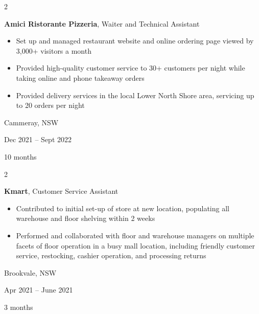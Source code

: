 \documentclass[10pt, a4paper]{article}
\newenvironment{highlights}{
    \begin{itemize}[
        topsep=0.10 cm,
        parsep=0.10 cm,
        partopsep=0pt,
        itemsep=0pt,
        leftmargin=0.4 cm + 10pt
    ]
}{
    \end{itemize}
} %
\newenvironment{twocolentry}[2][]{
    \onecolentry
    \def\secondColumn{#2}
    \setcolumnwidth{\fill, 4.5 cm}
    \begin{paracol}{2}
}{
    \switchcolumn \raggedleft \secondColumn
    \end{paracol}
    \endonecolentry
} %
\begin{document}
        \vspace{0.2 cm}

        \begin{twocolentry}{
            Cammeray, NSW

        Dec 2021 – Sept 2022

        10 months
        }
            \textbf{Amici Ristorante Pizzeria}, Waiter and Technical Assistant
            \begin{highlights}
                \item Set up and managed restaurant website and online ordering page viewed by 3,000+ visitors a month
                \item Provided high-quality customer service to 30+ customers per night while taking online and phone takeaway orders
                \item Provided delivery services in the local Lower North Shore area, servicing up to 20 orders per night
            \end{highlights}
        \end{twocolentry}


        \vspace{0.2 cm}

        \begin{twocolentry}{
            Brookvale, NSW

        Apr 2021 – June 2021

        3 months
        }
            \textbf{Kmart}, Customer Service Assistant
            \begin{highlights}
                \item Contributed to initial set-up of store at new location, populating all warehouse and floor shelving within 2 weeks
                \item Performed and collaborated with floor and warehouse managers on multiple facets of floor operation in a busy mall location, including friendly customer service, restocking, cashier operation, and processing returns
            \end{highlights}
        \end{twocolentry}


        \vspace{0.2 cm}
\end{document}
